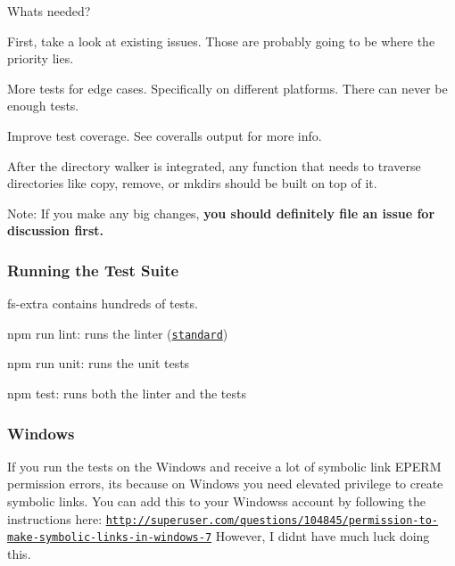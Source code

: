 \href{https://github.com/feross/standard}{\tt }

What\textquotesingle{}s needed?
\begin{DoxyItemize}
\item First, take a look at existing issues. Those are probably going to be where the priority lies.
\item More tests for edge cases. Specifically on different platforms. There can never be enough tests.
\item Improve test coverage. See coveralls output for more info.
\item After the directory walker is integrated, any function that needs to traverse directories like {\ttfamily copy}, {\ttfamily remove}, or {\ttfamily mkdirs} should be built on top of it.
\end{DoxyItemize}

Note\+: If you make any big changes, {\bfseries you should definitely file an issue for discussion first.}

\subsubsection*{Running the Test Suite}

fs-\/extra contains hundreds of tests.


\begin{DoxyItemize}
\item {\ttfamily npm run lint}\+: runs the linter (\href{http://standardjs.com/}{\tt standard})
\item {\ttfamily npm run unit}\+: runs the unit tests
\item {\ttfamily npm test}\+: runs both the linter and the tests
\end{DoxyItemize}

\subsubsection*{Windows}

If you run the tests on the Windows and receive a lot of symbolic link {\ttfamily E\+P\+E\+RM} permission errors, it\textquotesingle{}s because on Windows you need elevated privilege to create symbolic links. You can add this to your Windows\textquotesingle{}s account by following the instructions here\+: \href{http://superuser.com/questions/104845/permission-to-make-symbolic-links-in-windows-7}{\tt http\+://superuser.\+com/questions/104845/permission-\/to-\/make-\/symbolic-\/links-\/in-\/windows-\/7} However, I didn\textquotesingle{}t have much luck doing this.

